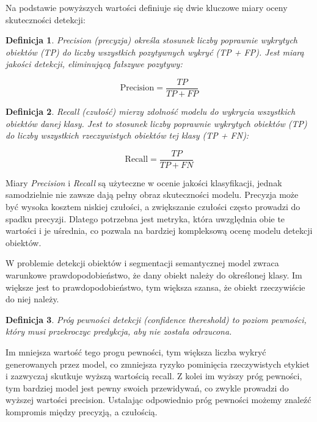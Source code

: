 \documentclass[licencjacka]{pracamgr}
\newtheorem{defi}{Definicja}[section]
\begin{document}
Na podstawie powyższych wartości definiuje się dwie kluczowe miary oceny skuteczności detekcji:

\begin{defi}\label{precision}
\emph{Precision} (precyzja) określa stosunek liczby poprawnie wykrytych obiektów (TP) do liczby wszystkich pozytywnych wykryć (TP + FP). Jest miarą jakości detekcji, eliminującą fałszywe pozytywy:

\begin{equation}
\text{Precision} = \frac{TP}{TP + FP}
\end{equation}

\end{defi}

\begin{defi}\label{recall}
\emph{Recall} (czułość) mierzy zdolność modelu do wykrycia wszystkich obiektów danej klasy. Jest to stosunek liczby poprawnie wykrytych obiektów (TP) do liczby wszystkich rzeczywistych obiektów tej klasy (TP + FN):

\begin{equation}
\text{Recall} = \frac{TP}{TP + FN}
\end{equation}

\end{defi}

Miary \emph{Precision} i \emph{Recall} są użyteczne w ocenie jakości klasyfikacji, jednak samodzielnie nie zawsze dają pełny obraz skuteczności modelu. Precyzja może być wysoka kosztem niskiej czułości, a zwiększanie czułości często prowadzi do spadku precyzji. Dlatego potrzebna jest metryka, która uwzględnia obie te wartości i je uśrednia, co pozwala na bardziej kompleksową ocenę modelu detekcji obiektów.

W problemie detekcji obiektów i segmentacji semantycznej model zwraca warunkowe prawdopodobieństwo, że dany obiekt należy do określonej klasy. Im większe jest to prawdopodobieństwo, tym większa szansa, że obiekt rzeczywiście do niej należy.

\begin{defi}\label{conf}
Próg pewności detekcji (confidence thereshold) to poziom pewności, który musi przekroczyc predykcja, aby nie została odrzucona.
\end{defi}

Im mniejsza wartość tego progu pewności, tym większa liczba wykryć generowanych przez model, co zmniejsza ryzyko pominięcia rzeczywistych etykiet i zazwyczaj skutkuje wyższą wartością recall. Z kolei im wyższy próg pewności, tym bardziej model jest pewny swoich przewidywań, co zwykle prowadzi do wyższej wartości precision. Ustalając odpowiednio próg pewności możemy znaleźć kompromis między precyzją, a czułością.
\end{document}
